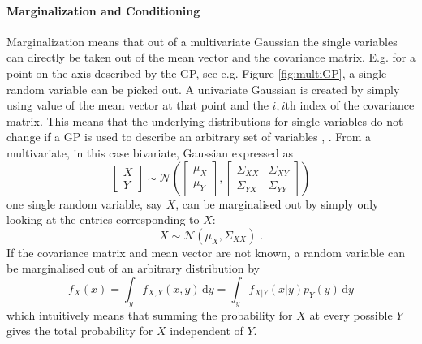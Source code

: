 \documentclass[%
  a4paper,oneside,%
  11pt,%
  smallchapters,
  style=printdev,
  extramargin,
  green,%
  rgb, <cmyk>
  ]{tubsbook}
\begin{document}
\paragraph{Marginalization and Conditioning} 
\label{sec:Marg}
Marginalization means that out of a multivariate Gaussian the single variables can directly be taken out of the mean vector and the covariance matrix. E.g. for a point on the axis described by the GP, see e.g. Figure \ref{fig:multiGP}, a single random variable can be picked out. A univariate Gaussian is created by simply using value of the mean vector at that point and the $i,i \mathrm{th}$ index of the covariance matrix. This means that the underlying distributions for single variables do not change if a GP is used to describe an arbitrary set of variables \cite[p. 13]{rasmussen2006}, \cite{gortler2019}.
From a multivariate, in this case bivariate, Gaussian expressed as
\begin{equation}
\begin{bmatrix}
           X \\
           Y
         \end{bmatrix} \sim \mathcal{N}\left( \begin{bmatrix}
           \mu_X \\
           \mu_Y
         \end{bmatrix}, \begin{bmatrix}
\Sigma_{XX} & \Sigma_{XY} \\
\Sigma_{YX} & \Sigma_{YY} 
\end{bmatrix}  \right)
\end{equation}
one single random variable, say $X$, can be marginalised out by simply only looking at the entries corresponding to $X$:
\begin{equation}
X \sim \mathcal{N}(\mu_X, \Sigma_{XX}) \;.
\end{equation}
If the covariance matrix and mean vector are not known, a random variable can be marginalised out of an arbitrary distribution by
\begin{equation}
f_X(x) = \int_y f_{X,Y}(x,y)\,\mathrm{d}y = \int_y f_{X|Y}(x|y)p_Y(y)\,\mathrm{d}y
\label{eqn:margi}
\end{equation}
which intuitively means that summing the probability for $X$ at every possible $Y$ gives the total probability for $X$ independent of $Y$. 
\end{document}
